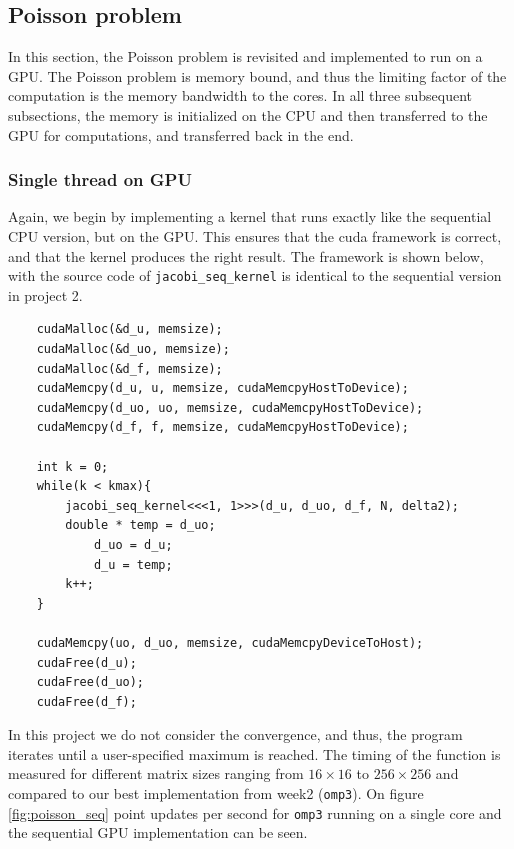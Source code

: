 \subsection{Poisson problem}
In this section, the Poisson problem is revisited and implemented to run on a GPU. The Poisson problem is memory bound, and thus the limiting factor of the computation is the memory bandwidth to the cores. In all three subsequent subsections, the memory is initialized on the CPU and then transferred to the GPU for computations, and transferred back in the end.

\subsubsection{Single thread on GPU}
Again, we begin by implementing a kernel that runs exactly like the sequential CPU version, but on the GPU. This ensures that the cuda framework is correct, and that the kernel produces the right result. The framework is shown below, with the source code of \texttt{jacobi\_seq\_kernel} is identical to the sequential version in project 2. 

\begin{lstlisting}
	cudaMalloc(&d_u, memsize);
	cudaMalloc(&d_uo, memsize);
	cudaMalloc(&d_f, memsize);	
	cudaMemcpy(d_u, u, memsize, cudaMemcpyHostToDevice);
	cudaMemcpy(d_uo, uo, memsize, cudaMemcpyHostToDevice);
	cudaMemcpy(d_f, f, memsize, cudaMemcpyHostToDevice);

	int k = 0;
	while(k < kmax){
		jacobi_seq_kernel<<<1, 1>>>(d_u, d_uo, d_f, N, delta2);
		double * temp = d_uo;
    		d_uo = d_u;
    		d_u = temp;
		k++;
	}

	cudaMemcpy(uo, d_uo, memsize, cudaMemcpyDeviceToHost);
	cudaFree(d_u);
	cudaFree(d_uo);
	cudaFree(d_f);
\end{lstlisting}
In this project we do not consider the convergence, and thus, the program iterates until a user-specified maximum is reached. The timing of the function is measured for different matrix sizes ranging from $16\times 16$ to $256\times 256$ and compared to our best implementation from week2 (\texttt{omp3}). On figure \ref{fig:poisson_seq} point updates per second for \texttt{omp3} running on a single core and the sequential GPU implementation can be seen.

